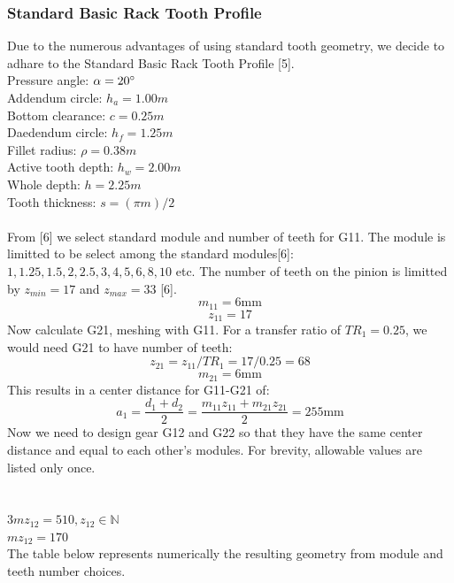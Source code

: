 \documentclass{article}
\begin{document}
\subsubsection{Standard Basic Rack Tooth Profile}
Due to the numerous advantages of using standard tooth geometry, we decide to adhare to the Standard Basic Rack Tooth Profile [5]. \\
Pressure angle: $\alpha = 20\degree$  \\
Addendum circle: $h_a = 1.00m$ \\
Bottom clearance: $c = 0.25m$ \\
Daedendum circle: $h_f = 1.25m$ \\
Fillet radius: $\rho = 0.38m$ \\
Active tooth depth: $h_w = 2.00m$ \\
Whole depth: $h = 2.25m$ \\
Tooth thickness: $s = (\pi m)/ 2$ \\
\\
From [6] we select standard module and number of teeth for G11.
The module is limitted to be select among the standard modules[6]: $1, 1.25, 1.5, 2, 2.5, 3, 4, 5, 6, 8, 10$ etc.
The number of teeth on the pinion is limitted by $z_{min} = 17$ and $z_{max} = 33$ [6]. \\
$$m_{11} = 6 \si{\milli\meter}$$
$$z_{11} = 17$$
Now calculate G21, meshing with G11.
For a transfer ratio of $TR_1 = 0.25$, we would need G21 to have number of teeth: \\
$$ z_{21} = z_{11} / TR_1 = 17 / 0.25 = 68 $$
$$ m_{21} = 6\si{\milli\meter}  $$
This results in a center distance for G11-G21 of: \\
$$ a_1 = \frac{d_1 + d_2}{2} = \frac{m_{11} z_{11} + m_{21} z_{21}}{2} = 255 \si{\milli\meter}$$
Now we need to design gear G12 and G22 so that they have the same center distance and equal to each other's modules.
For brevity, allowable values are listed only once. \\[0.3cm]
 \\[0.3cm]
 \\[0.3cm]
$ 3 m z_{12} = 510, z_{12} \in \mathbb{N} $ \\[0.3cm]
$ m z_{12} = 170 $ \\[0.3cm]
The table below represents numerically the resulting geometry from module and teeth number choices. \\ [0.5cm]
\end{document}
